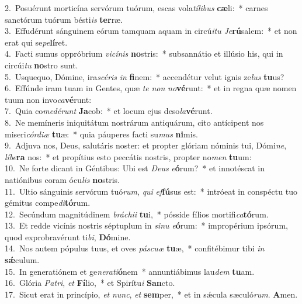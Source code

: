 {2.~}Posuérunt morticína servórum tuórum, escas vola\textit{tí}\textit{li}\textit{bus} \textbf{cæ}li:~* carnes sanctórum tuórum bésti\textit{is} \textbf{ter}ræ.\\
{3.~}Effudérunt sánguinem eórum tamquam aquam in circú\textit{i}\textit{tu} \textit{Je}\textbf{rú}salem:~* et non erat qui se\textit{pe}\textbf{lí}ret.\\
{4.~}Facti sumus oppróbrium \textit{vi}\textit{cí}\textit{nis} \textbf{no}stris:~* subsannátio et illúsio his, qui in circúi\textit{tu} \textbf{no}stro sunt.\\
{5.~}Usquequo, Dómine, ira\textit{scé}\textit{ris} \textit{in} \textbf{fi}nem:~* accendétur velut ignis ze\textit{lus} \textbf{tu}us?\\
{6.~}Effúnde iram tuam in Gentes, quæ \textit{te} \textit{non} \textit{no}\textbf{vé}runt:~* et in regna quæ nomen tuum non invo\textit{ca}\textbf{vé}runt:\\
{7.~}Quia co\textit{me}\textit{dé}\textit{runt} \textbf{Ja}cob:~* et locum ejus deso\textit{la}\textbf{vé}runt.\\
{8.~}Ne memíneris iniquitátum nostrárum antiquárum, cito antícipent nos miseri\textit{cór}\textit{di}\textit{æ} \textbf{tu}æ:~* quia páuperes facti su\textit{mus} \textbf{ni}mis.\\
{9.~}Adjuva nos, Deus, salutáris noster: et propter glóriam nóminis tui, Dómi\textit{ne}, \textit{lí}\textit{be}\textbf{ra} nos:~* et propítius esto peccátis nostris, propter no\textit{men} \textbf{tu}um:\\
{10.~}Ne forte dicant in Géntibus: Ubi est \textit{De}\textit{us} \textit{e}\textbf{ó}rum?~* et innotéscat in natiónibus coram ócu\textit{lis} \textbf{no}stris.\\
{11.~}Ultio sánguinis servórum tuó\textit{rum}, \textit{qui} \textit{ef}\textbf{fú}sus est:~* intróeat in conspéctu tuo gémitus compe\textit{di}\textbf{tó}rum.\\
{12.~}Secúndum magnitúdinem \textit{brá}\textit{chi}\textit{i} \textbf{tu}i,~* pósside fílios mortifi\textit{ca}\textbf{tó}rum.\\
{13.~}Et redde vicínis nostris séptuplum in \textit{si}\textit{nu} \textit{e}\textbf{ó}rum:~* impropérium ipsórum, quod exprobravérunt ti\textit{bi}, \textbf{Dó}mine.\\
{14.~}Nos autem pópulus tuus, et oves \textit{pá}\textit{scu}\textit{æ} \textbf{tu}æ,~* confitébimur tibi \textit{in} \textbf{sǽ}culum.\\
{15.~}In generatiónem et ge\textit{ne}\textit{ra}\textit{ti}\textbf{ó}nem~* annuntiábimus lau\textit{dem} \textbf{tu}am.\\
{16.~}Glória \textit{Pa}\textit{tri}, \textit{et} \textbf{Fí}lio,~* et Spirítu\textit{i} \textbf{San}cto.\\
{17.~}Sicut erat in princípio, \textit{et} \textit{nunc}, \textit{et} \textbf{sem}per,~* et in sǽcula sæculó\textit{rum}. \textbf{A}men.\\

